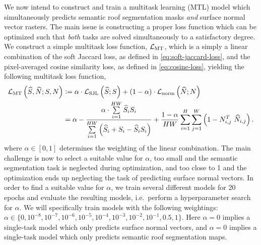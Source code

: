 We now intend to construct and train a multitask learning (MTL) model which simultaneously predicts semantic roof segmentation masks \emph{and} surface normal vector rasters.
The main issue is constructing a proper loss function which can be optimized such that \emph{both} tasks are solved simultaneously to a satisfactory degree.
We construct a simple multitask loss function, $\mathcal{L}_{\mathrm{MT}}$, which is a simply a linear combination of the soft Jaccard loss, as defined in \cref{eq:soft-jaccard-loss}, and the pixel-averaged cosine similarity loss, as defined in \cref{eq:cosine-loss}, yielding the following multitask loss function,
\begin{align*}
  \mtlossf
  &\defeq
  \alpha \cdot \seglossf
  +
  (1 - \alpha) \cdot \normlossf
  \\
  &=
  \alpha - \frac{%
    \alpha \cdot \sum\limits_{i = 1}^{HW}
    \predsegraster_i \segraster_i
  }{%
    \sum\limits_{i = 1}^{HW} \left(
      \predsegraster_i
      +
      \segraster_i
      -
      \predsegraster_i \segraster_i
    \right)
  }
  +
  \frac{1 - \alpha}{HW}
  \sum_{i = 1}^{H} \sum_{j = 1}^{W} \left(
    1 - \normraster_{i,j}^T~\prednormraster_{i,j}
  \right).
\end{align*}
%
where $\alpha \in [0, 1]$ determines the weighting of the linear combination.
The main challenge is now to select a suitable value for $\alpha$, too small and the semantic segmentation task is neglected during optimization, and too close to 1 and the optimization ends up neglecting the task of predicting surface normal vectors.
In order to find a suitable value for $\alpha$, we train several different models for 20 epochs and evaluate the resulting models, i.e.\ perform a hyperparameter search for $\alpha$.
We will specifically train models with the following weightings: $\alpha \in \{0, 10^{-8}, 10^{-7}, 10^{-6}, 10^{-5}, 10^{-4}, 10^{-3}, 10^{-2}, 10^{-1}, 0.5, 1\}$.
Here $\alpha = 0$ implies a single-task model which only predicts surface normal vectors, and $\alpha = 0$ implies a single-task model which only predicts semantic roof segmentation maps.

